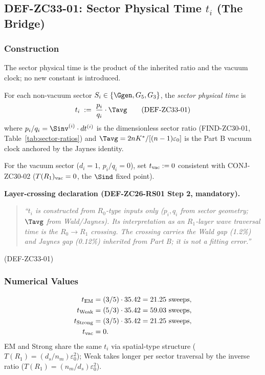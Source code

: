 \documentclass[12pt, a4paper]{article}
\begin{document}
\subsection{DEF-ZC33-01: Sector Physical Time $t_i$ (The Bridge)}
\label{sec:bridge}

\subsubsection{Construction}

The sector physical time is the product of the inherited
ratio and the vacuum clock; no new constant is introduced.

\begin{formalbox}[title={DEF-ZC33-01: Sector physical time
  $t_i$}]
For each non-vacuum sector $S_i\in\{\Ggen, G_5, G_3\}$, the
\emph{sector physical time} is
\begin{equation}
  t_i \;:=\; \frac{p_i}{q_i}\cdot \Tavg
  \tag{DEF-ZC33-01}\label{eq:def-zc33-01}
\end{equation}
where $p_i/q_i = \Sinv^{(i)}\cdot dt^{(i)}$ is the
dimensionless sector ratio (FIND-ZC30-01,
Table~\ref{tab:sector-ratios}) and $\Tavg = 2nK^*/[(n-1)
\varepsilon_0]$ is the Part B vacuum clock anchored by the
Jaynes identity.

For the vacuum sector ($d_i = 1$, $p_i/q_i = 0$), set
$t_{\rm vac} := 0$ consistent with CONJ-ZC30-02 ($T(R_1)_{\rm vac}
= 0$, the $\Sind$ fixed point).

\medskip
\textbf{Layer-crossing declaration (DEF-ZC26-RS01 Step 2,
mandatory).}
\begin{quote}
\emph{``$t_i$ is constructed from $R_0$-type inputs only
($p_i, q_i$ from sector geometry; $\Tavg$ from Wald/Jaynes).
Its interpretation as an $R_1$-layer wave traversal time
is the $R_0\to R_1$ crossing. The crossing carries the
Wald gap (1.2\%) and Jaynes gap (0.12\%) inherited from
Part B; it is not a fitting error.''}
\end{quote}
\hfill\textup{(DEF-ZC33-01)}
\end{formalbox}

\subsubsection{Numerical Values}

\begin{derivedbox}[title={Sector physical times $t_i$ at
  $\Tavg = 35.42$ sweeps}]
\begin{align*}
  t_{\rm EM} &= (3/5)\cdot 35.42 = 21.25\ \text{sweeps},\\
  t_{\rm Weak} &= (5/3)\cdot 35.42 = 59.03\ \text{sweeps},\\
  t_{\rm Strong} &= (3/5)\cdot 35.42 = 21.25\ \text{sweeps},\\
  t_{\rm vac} &= 0.
\end{align*}
EM and Strong share the same $t_i$ via spatial-type structure
($T(R_1) = (d_s/n_m)\varepsilon_0^2$); Weak takes longer per
sector traversal by the inverse ratio
($T(R_1) = (n_m/d_s)\varepsilon_0^2$).
\end{derivedbox}
\end{document}
